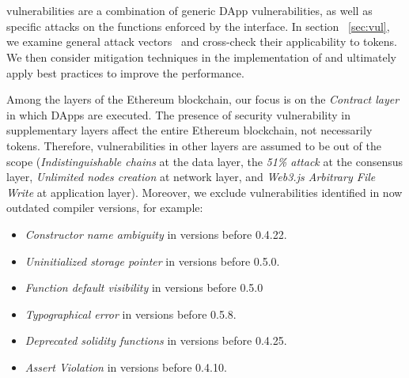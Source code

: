 
\section{\sys}\label{sec:proposal}
\erc vulnerabilities are a combination of generic DApp vulnerabilities, as well as specific attacks on the functions enforced by the \erc interface. In section ~\ref{sec:vul}, we examine general attack vectors~\cite{SolidtySecBlog,EthSecServ,SoliditySecCon,ConsensysSecCon,LandoKL} and cross-check their applicability to \erc tokens. { \blue We then consider mitigation techniques in the implementation of \sys and ultimately apply best practices to improve the performance.}

Among the layers of the Ethereum blockchain, our focus is on the \textit{Contract layer} in which DApps are executed. The presence of security vulnerability in supplementary layers affect the entire Ethereum blockchain, not necessarily \erc tokens. Therefore, vulnerabilities in other layers are assumed to be out of the scope (\eg \textit{Indistinguishable chains} at the data layer, the \textit{51\% attack} at the consensus layer, \textit{Unlimited nodes creation} at network layer, and \textit{Web3.js Arbitrary File Write} at application layer). Moreover, we exclude vulnerabilities identified in now outdated compiler versions, for example:
\begin{itemize}[noitemsep,topsep=0pt]
	\item \textit{Constructor name ambiguity} in versions before 0.4.22.
	\item \textit{Uninitialized storage pointer} in versions before 0.5.0.
	\item \textit{Function default visibility} in versions before 0.5.0
	\item \textit{Typographical error} in versions before 0.5.8.
	\item \textit{Deprecated solidity functions} in versions before 0.4.25.
	\item \textit{Assert Violation} in versions before 0.4.10.
\end{itemize}

